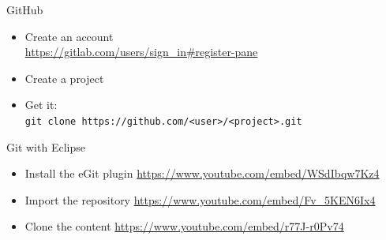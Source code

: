 \documentclass[English,c,%
hyperref={%
    pdftitle={FISA-DE2 OOP in Java},%
    pdfauthor={Muller, Gravier, Laforest, Subercaze},%
    pdfsubject={OOP in Java},%
    pdfkeywords={OOP, Java},%
    colorlinks=true,%
    urlcolor=blue,%
    linkcolor=%
    },%
xcolor={pdftex,svgnames} %
]{beamer}
\begin{document}
\begin{frame}{GitHub \href{https://github.com}{\color{white}{[1]}}}
  \begin{itemize}
    \item<1-> Create an account\\
    \url{https://gitlab.com/users/sign\_in\#register-pane}
    \bigskip
%
    \item<2-> Create a project\\
    \bigskip
%
    \item<4-> Get it:\\
    { \small
      \texttt{git clone https://github.com/<user>/<project>.git}
    }
  \end{itemize}

\end{frame}

\begin{frame}{Git with Eclipse}

  \begin{itemize}
    \item Install the eGit plugin
    \url{https://www.youtube.com/embed/WSdIbqw7Kz4}
    \bigskip
%
    \item Import the repository
    \url{https://www.youtube.com/embed/Fv_5KEN6Ix4}
    \bigskip
%
    \item Clone the content
    \url{https://www.youtube.com/embed/r77J-r0Pv74}
  \end{itemize}

\end{frame}
\end{document}
